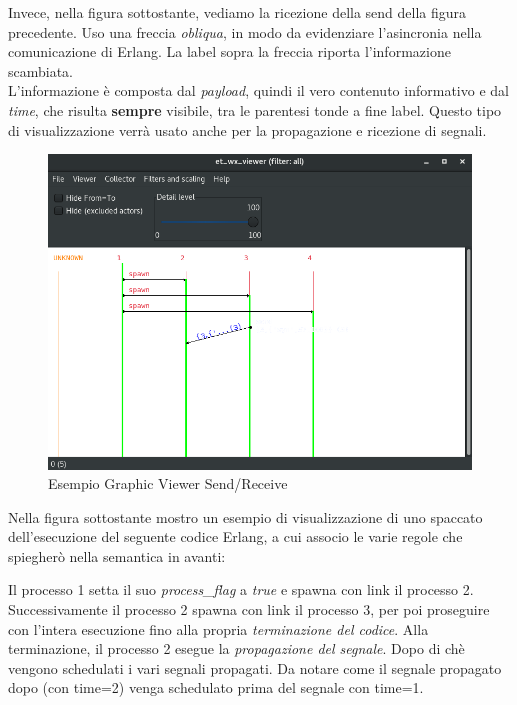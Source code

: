 \documentclass[Contributo.tex]{subfiles}
\begin{document}
	Invece, nella figura sottostante, vediamo la ricezione della send della figura precedente. Uso una freccia \textit{obliqua}, in modo da evidenziare l'asincronia nella comunicazione di Erlang.
	La label sopra la freccia riporta l'informazione scambiata.\\
	L'informazione è composta dal \textit{payload}, quindi il vero contenuto informativo e dal \textit{time}, che risulta \textbf{sempre} visibile, tra le parentesi tonde a fine label. Questo tipo di visualizzazione verrà usato anche per la propagazione e ricezione di segnali.
	\begin{figure}[H]
		\includegraphics[scale=0.5]{./LavoroLuca/EstensioneCauder/Imgs/GraphicViewerSendReceive}
		\caption{Esempio Graphic Viewer Send/Receive}
		\label{fig6}
	\end{figure}
	Nella figura sottostante mostro un esempio di visualizzazione di uno spaccato dell'esecuzione del seguente codice Erlang, a cui associo le varie regole che spiegherò nella semantica in avanti:
		
	Il processo 1 setta il suo \textit{process\_flag} a \textit{true} e spawna con link il processo 2. Successivamente il processo 2 spawna con link il processo 3, per poi proseguire con l'intera esecuzione fino alla propria \textit{terminazione del codice}. Alla terminazione, il processo 2 esegue la \textit{propagazione del segnale}. Dopo di chè vengono schedulati i vari segnali propagati. Da notare come il segnale propagato dopo (con time=2) venga schedulato prima del segnale con time=1.
\end{document}
